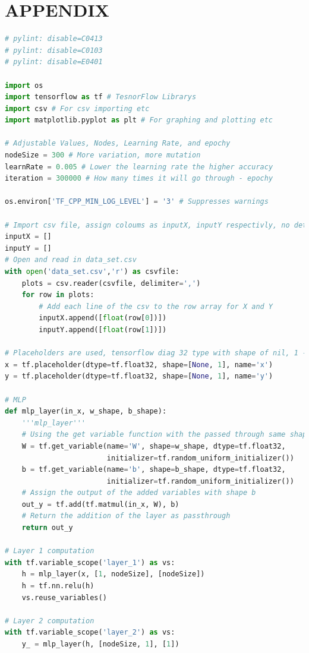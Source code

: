 \documentclass[a4paper, 10pt]{IEEEconf}
\begin{document}
\clearpage
\onecolumn
\section*{APPENDIX}
\begin{lstlisting}[language = Python]
# pylint: disable=C0413
# pylint: disable=C0103
# pylint: disable=E0401

import os
import tensorflow as tf # TesnorFlow Librarys
import csv # For csv importing etc
import matplotlib.pyplot as plt # For graphing and plotting etc

# Adjustable Values, Nodes, Learning Rate, and epochy 
nodeSize = 300 # More variation, more mutation
learnRate = 0.005 # Lower the learning rate the higher accuracy
iteration = 300000 # How many times it will go through - epochy

os.environ['TF_CPP_MIN_LOG_LEVEL'] = '3' # Suppresses warnings

# Import csv file, assign coloums as inputX, inputY respectivly, no determined allocation size for memory
inputX = [] 
inputY = [] 
# Open and read in data_set.csv
with open('data_set.csv','r') as csvfile: 
    plots = csv.reader(csvfile, delimiter=',') 
    for row in plots: 
		# Add each line of the csv to the row array for X and Y
        inputX.append([float(row[0])]) 
        inputY.append([float(row[1])])

# Placeholders are used, tensorflow diag 32 type with shape of nil, 1 - labeled x and y respectivly
x = tf.placeholder(dtype=tf.float32, shape=[None, 1], name='x')
y = tf.placeholder(dtype=tf.float32, shape=[None, 1], name='y')

# MLP
def mlp_layer(in_x, w_shape, b_shape):
    '''mlp_layer'''
	# Using the get variable function with the passed through same shapes and random initializer with no conditions
    W = tf.get_variable(name='W', shape=w_shape, dtype=tf.float32,
                        initializer=tf.random_uniform_initializer())
    b = tf.get_variable(name='b', shape=b_shape, dtype=tf.float32,
                        initializer=tf.random_uniform_initializer())
	# Assign the output of the added variables with shape b					
    out_y = tf.add(tf.matmul(in_x, W), b)
	# Return the addition of the layer as passthrough
    return out_y

# Layer 1 computation
with tf.variable_scope('layer_1') as vs:
    h = mlp_layer(x, [1, nodeSize], [nodeSize])
    h = tf.nn.relu(h)
    vs.reuse_variables()

# Layer 2 computation
with tf.variable_scope('layer_2') as vs:
    y_ = mlp_layer(h, [nodeSize, 1], [1])


\end{lstlisting}
\end{document}
